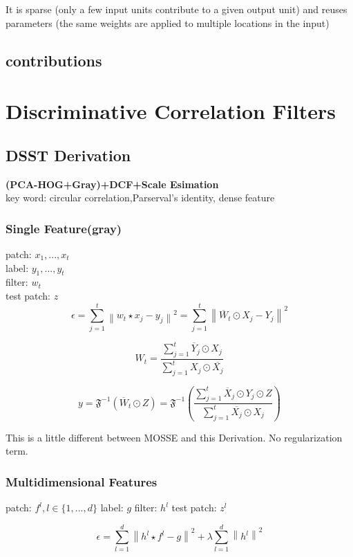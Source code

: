 \documentclass[11pt]{article}
\begin{document}
It is sparse (only a few input units contribute to a given output unit) and reuses parameters (the same weights are applied to multiple locations in the input)

\subsection{contributions}

\section{Discriminative Correlation Filters}
	\subsection{DSST Derivation}
	\textbf{(PCA-HOG+Gray)+DCF+Scale Esimation}\\
	key word: circular correlation,Parserval's identity, dense feature
		\subsubsection{Single Feature(gray)}
		patch: $x_1,...,x_t$	\\
		label: $y_1,...,y_t$	\\
		filter: $w_t$	\\
		test patch: $z$	\\

$$
\epsilon =  \sum_{j=1}^{t}\left \| w_{t}\star x_{j}-y_{j} \right \|^{2} = \sum_{j=1}^{t}\left \| \overline{W}_{t} \odot X_{j}-Y_{j} \right \|^{2}
$$


$$
W_{t}=\frac{\sum_{j=1}^{t}\overline{Y}_{j} \odot X_{j}}{\sum_{j=1}^{t}X_{j} \odot\overline{ X_{j}}} 
$$

$$
y=\mathfrak{F}^{-1} \left( {\overline{W}_{t} \odot Z}\right)
 = \mathfrak{F}^{-1} \left(\frac{\sum_{j=1}^{t}\overline{X}_{j} \odot Y_{j} \odot Z}{\sum_{j=1}^{t}\overline{X_{j}} \odot X_{j}} \right)
$$

This is a little different between MOSSE\cite{MOSSE} and this Derivation. No regularization term.

\subsubsection{Multidimensional Features}

patch: 
$  f^{l} ,l\in \{ 1,...,d \} $
label: 
$ g $
filter: 
$ h^{l} $
test patch: 
$ z^{l} $

$$
\epsilon =  \sum_{l=1}^{d}\left \| h^{l}\star f^{l}-g \right \|^{2} +\lambda \sum_{l=1}^{d}\left\|h^{l} \right\|^{2}
$$
\end{document}

